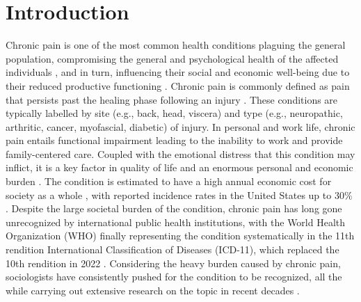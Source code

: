 \section{Introduction}
\label{section:Introduction}
Chronic pain is one of the most common health conditions plaguing the general population, compromising the general and psychological health of the affected individuals \citep{becker1997pain, gureje1998persistent}, and in turn, influencing their social and economic well-being due to their reduced productive functioning \citep{latham1994socioeconomic}. Chronic pain is commonly defined as pain that persists past the healing phase following an injury \citep{merskey1986classification}. These conditions are typically labelled by site (e.g., back, head, viscera) and type (e.g., neuropathic, arthritic, cancer, myofascial, diabetic) \citep{APKARIAN200981} of injury. In personal and work life, chronic pain entails functional impairment leading to the inability to work and provide family-centered care. Coupled with the emotional distress that this condition may inflict, it is a key factor in quality of life and an enormous personal and economic burden \citep{duenas2016review}. The condition is estimated to have a high annual economic cost for society as a whole \citep{bp-cost}, with reported incidence rates in the United States up to $30\%$ \citep{johannes2010prevalence}. Despite the large societal burden of the condition, chronic pain has long gone unrecognized by international public health institutions, with the World Health Organization (WHO) finally representing the condition systematically in the 11th rendition International Classification of Diseases (ICD-11), which replaced the 10th rendition in 2022 \citep{ICD-11}. Considering the heavy burden caused by chronic pain, sociologists have consistently pushed for the condition to be recognized, all the while carrying out extensive research on the topic in recent decades \citep{gatchel2007biopsychosocial}. 

